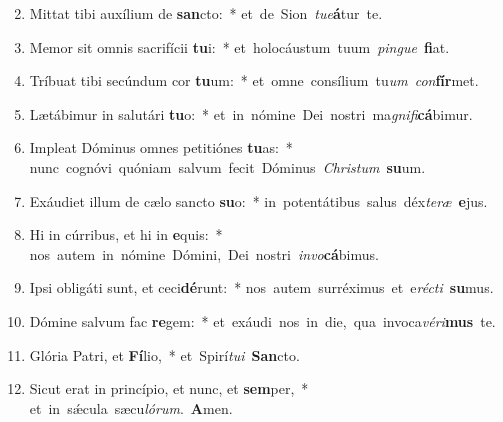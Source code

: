 \begin{flushleft}
\begin{enumerate}[leftmargin=*]
\setcounter{enumi}{1}

\item Mittat tibi auxílium de \textbf{san}cto:~* \mbox{et de Sion {\it tu}{\it e}\textbf{á}tur te.}
\item Memor sit omnis sacrifícii \textbf{tu}i:~* \mbox{et holocáustum tuum {\it pin}{\it gue} \textbf{fi}at.}
\item Tríbuat tibi secúndum cor \textbf{tu}um:~* \mbox{et omne consílium tu{\it um} {\it con}\textbf{fír}met.}
\item Lætábimur in salutári \textbf{tu}o:~* \mbox{et in nómine Dei nostri ma{\it gni}{\it fi}\textbf{cá}bimur.}
\item Impleat Dóminus omnes petitiónes \textbf{tu}as:~* \mbox{nunc cognóvi quóniam salvum fecit Dóminus {\it Chri}{\it stum} \textbf{su}um.}
\item Exáudiet illum de cælo sancto \textbf{su}o:~* \mbox{in potentátibus salus déx{\it te}{\it ræ} \textbf{e}jus.}
\item Hi in cúrribus, et hi in \textbf{e}quis:~* \mbox{nos autem in nómine Dómini, Dei nostri {\it in}{\it vo}\textbf{cá}bimus.}
\item Ipsi obligáti sunt, et ceci\textbf{dé}runt:~* \mbox{nos autem surréximus et e{\it ré}{\it cti} \textbf{su}mus.}
\item Dómine salvum fac \textbf{re}gem:~* \mbox{et exáudi nos in die, qua invoca{\it vé}{\it ri}\textbf{mus} te.}
\item Glória Patri, et \textbf{Fí}lio,~* \mbox{et Spirí{\it tu}{\it i} \textbf{San}cto.}
\item Sicut erat in princípio, et nunc, et \textbf{sem}per,~* \mbox{et in s\'{\ae}cula sæcu{\it ló}{\it rum}. \textbf{A}men.}

\end{enumerate}
\end{flushleft}

